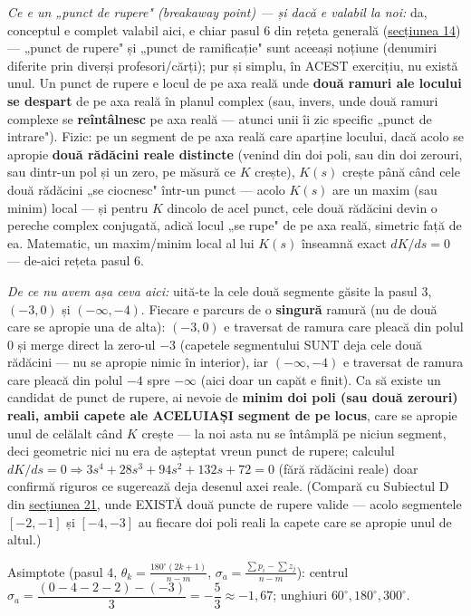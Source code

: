 \documentclass[10pt,a4paper]{article}
\newcommand{\tip}[1]{\textcolor{blue!55!black}{#1}}
\begin{document}
\tip{\textit{Ce e un „punct de rupere" (breakaway point) — și dacă e valabil la noi:} da, conceptul e complet valabil aici, e chiar pasul 6 din rețeta generală (\hyperref[sec:14]{secțiunea 14}) — „punct de rupere" și „punct de ramificație" sunt aceeași noțiune (denumiri diferite prin diverși profesori/cărți); pur și simplu, în ACEST exercițiu, nu există unul. Un punct de rupere e locul de pe axa reală unde \textbf{două ramuri ale locului se despart} de pe axa reală în planul complex (sau, invers, unde două ramuri complexe se \textbf{reîntâlnesc} pe axa reală — atunci unii îi zic specific „punct de intrare"). Fizic: pe un segment de pe axa reală care aparține locului, dacă acolo se apropie \textbf{două rădăcini reale distincte} (venind din doi poli, sau din doi zerouri, sau dintr-un pol și un zero, pe măsură ce $K$ crește), $K(s)$ crește până când cele două rădăcini „se ciocnesc" într-un punct — acolo $K(s)$ are un maxim (sau minim) local — și pentru $K$ dincolo de acel punct, cele două rădăcini devin o pereche complex conjugată, adică locul „se rupe" de pe axa reală, simetric față de ea. Matematic, un maxim/minim local al lui $K(s)$ înseamnă exact $dK/ds{=}0$ — de-aici rețeta pasul 6.}

\tip{\textit{De ce nu avem așa ceva aici:} uită-te la cele două segmente găsite la pasul 3, $(-3,0)$ și $(-\infty,-4)$. Fiecare e parcurs de o \textbf{singură} ramură (nu de două care se apropie una de alta): $(-3,0)$ e traversat de ramura care pleacă din polul $0$ și merge direct la zero-ul $-3$ (capetele segmentului SUNT deja cele două rădăcini — nu se apropie nimic în interior), iar $(-\infty,-4)$ e traversat de ramura care pleacă din polul $-4$ spre $-\infty$ (aici doar un capăt e finit). Ca să existe un candidat de punct de rupere, ai nevoie de \textbf{minim doi poli (sau două zerouri) reali, ambii capete ale ACELUIAȘI segment de pe locus}, care se apropie unul de celălalt când $K$ crește — la noi asta nu se întâmplă pe niciun segment, deci geometric nici nu era de așteptat vreun punct de rupere; calculul $dK/ds{=}0\Rightarrow3s^4{+}28s^3{+}94s^2{+}132s{+}72{=}0$ (fără rădăcini reale) doar confirmă riguros ce sugerează deja desenul axei reale. (Compară cu Subiectul D din \hyperref[sec:21]{secțiunea 21}, unde EXISTĂ două puncte de rupere valide — acolo segmentele $[-2,-1]$ și $[-4,-3]$ au fiecare doi poli reali la capete care se apropie unul de altul.)}

Asimptote (pasul 4, $\theta_k{=}\tfrac{180^\circ(2k+1)}{n-m}$, $\sigma_a{=}\tfrac{\sum p_i-\sum z_j}{n-m}$): centrul $\sigma_a{=}\dfrac{(0-4-2-2)-(-3)}3{=}-\dfrac53\approx-1{,}67$; unghiuri $60^\circ,180^\circ,300^\circ$.
\end{document}
